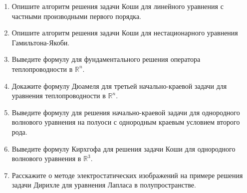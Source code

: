 %
%

\begin{enumerate}[resume]

\item  Опишите алгоритм решения задачи Коши для линейного уравнения с частными производными первого порядка. 

\item Опишите алгоритм решения задачи Коши для нестационарного уравнения Гамильтона-Якоби.

\item Выведите формулу для фундаментального решения оператора теплопроводности в $\mathbb{R}^n$.

\item Докажите формулу Дюамеля для третьей начально-краевой задачи для уравнения теплопроводности в $\mathbb{R}^n$.

\item Выведите формулу для решения начально-краевой задачи для однородного волнового уравнения на полуоси с однородным краевым условием второго рода.

\item Выведите формулу Кирхгофа для решения задачи Коши для однородного волнового уравнения в $\mathbb{R}^3$.

\item Расскажите о методе электростатических изображений на примере решения задачи Дирихле для уравнения Лапласа в полупространстве.

\end{enumerate}




